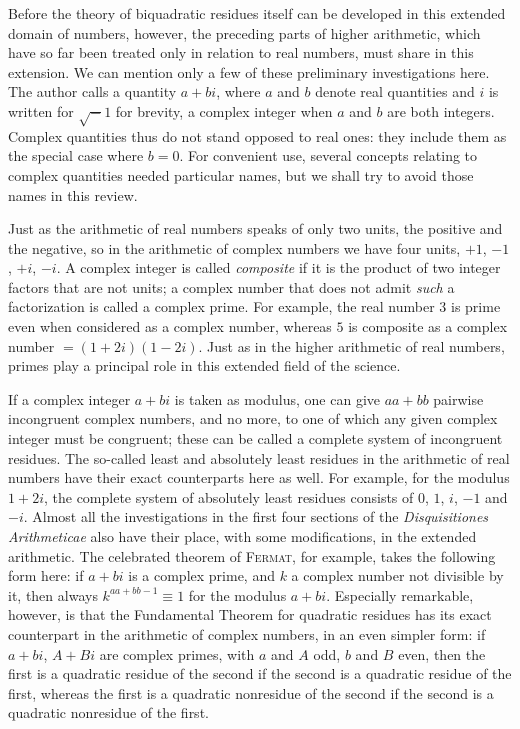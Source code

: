 Before the theory of biquadratic residues itself can be developed in this extended domain of numbers, however, the preceding parts of higher arithmetic, which have so far been treated only in relation to real numbers, must share in this extension. We can mention only a few of these preliminary investigations here. The author calls a quantity $a+bi$, where $a$ and $b$ denote real quantities and $i$ is written for $\surd-1$ for brevity, a complex integer when $a$ and $b$ are both integers. Complex quantities thus do not stand opposed to real ones: they include them as the special case where $b=0$. For convenient use, several concepts relating to complex quantities needed particular names, but we shall try to avoid those names in this review.

Just as the arithmetic of real numbers speaks of only two units, the positive and the negative, so in the arithmetic of
complex numbers we have four units, $+1$, $-1$, $+i$, $-i$. A complex integer is called \emph{composite} if it is the product of two integer factors that are not units; a complex number that does not admit \emph{such} a factorization is called a complex prime. For example, the real number $3$ is prime even when considered as a complex number, whereas $5$ is composite as a complex number $=(1+2i)(1-2i)$. Just as in the higher arithmetic of real numbers, primes play a principal role in this extended field of the science.

If a complex integer $a+bi$ is taken as modulus, one can give $aa+bb$ pairwise incongruent complex numbers, and no more, to one of which any given complex integer must be congruent; these can be called a complete system of incongruent residues. The so-called least and absolutely least residues in the arithmetic of real numbers have their exact counterparts here as well. For example, for the modulus $1+2i$, the complete system of absolutely least residues consists of $0$, $1$, $i$, $-1$ and $-i$. Almost all the investigations in the first four sections of the \emph{Disquisitiones Arithmeticae} also have their place, with some modifications, in the extended arithmetic. The celebrated theorem of \textsc{Fermat}, for example, takes the following form here: if $a+bi$ is a complex prime, and $k$ a complex number not divisible by it, then always $k^{aa+bb-1}\equiv1$ for the modulus $a+bi$. Especially remarkable, however, is that the Fundamental Theorem for quadratic residues has its exact counterpart in the arithmetic of complex numbers, in an even simpler form: if $a+bi$, $A+Bi$ are complex primes, with $a$ and $A$ odd, $b$ and $B$ even, then the first is a quadratic residue of the second if the second is a quadratic residue of the first, whereas the first is a quadratic nonresidue of the second if the second is a quadratic nonresidue of the first.

